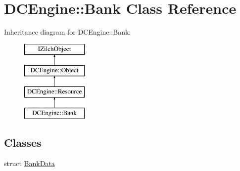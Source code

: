 \hypertarget{classDCEngine_1_1Bank}{\section{D\-C\-Engine\-:\-:Bank Class Reference}
\label{classDCEngine_1_1Bank}
}
Inheritance diagram for D\-C\-Engine\-:\-:Bank\-:\begin{figure}[H]
\begin{center}
\leavevmode
\includegraphics[height=4.000000cm]{classDCEngine_1_1Bank}
\end{center}
\end{figure}
\subsection*{Classes}
\begin{DoxyCompactItemize}
\item 
struct \hyperlink{structDCEngine_1_1Bank_1_1BankData}{Bank\-Data}
\end{DoxyCompactItemize}
